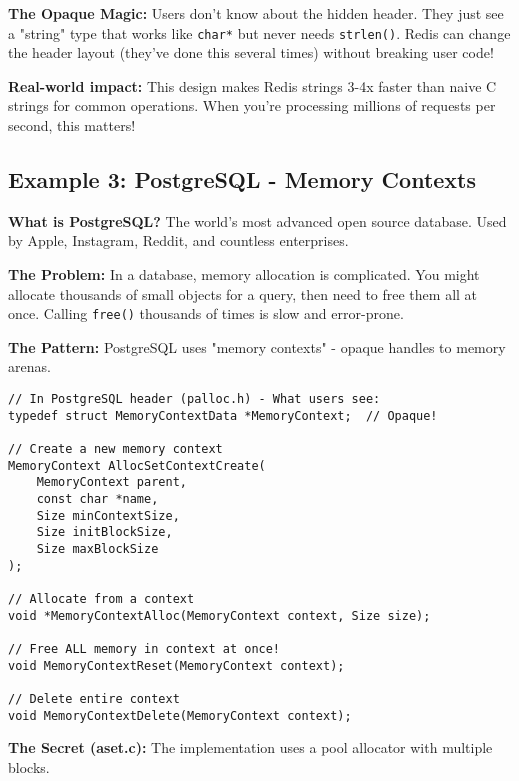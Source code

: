 \textbf{The Opaque Magic:} Users don't know about the hidden header. They just see a "string" type that works like \texttt{char*} but never needs \texttt{strlen()}. Redis can change the header layout (they've done this several times) without breaking user code!

\textbf{Real-world impact:} This design makes Redis strings 3-4x faster than naive C strings for common operations. When you're processing millions of requests per second, this matters!

\subsection{Example 3: PostgreSQL - Memory Contexts}

\textbf{What is PostgreSQL?} The world's most advanced open source database. Used by Apple, Instagram, Reddit, and countless enterprises.

\textbf{The Problem:} In a database, memory allocation is complicated. You might allocate thousands of small objects for a query, then need to free them all at once. Calling \texttt{free()} thousands of times is slow and error-prone.

\textbf{The Pattern:} PostgreSQL uses "memory contexts" - opaque handles to memory arenas.

\begin{lstlisting}
// In PostgreSQL header (palloc.h) - What users see:
typedef struct MemoryContextData *MemoryContext;  // Opaque!

// Create a new memory context
MemoryContext AllocSetContextCreate(
    MemoryContext parent,
    const char *name,
    Size minContextSize,
    Size initBlockSize,
    Size maxBlockSize
);

// Allocate from a context
void *MemoryContextAlloc(MemoryContext context, Size size);

// Free ALL memory in context at once!
void MemoryContextReset(MemoryContext context);

// Delete entire context
void MemoryContextDelete(MemoryContext context);
\end{lstlisting}

\textbf{The Secret (aset.c):} The implementation uses a pool allocator with multiple blocks.

